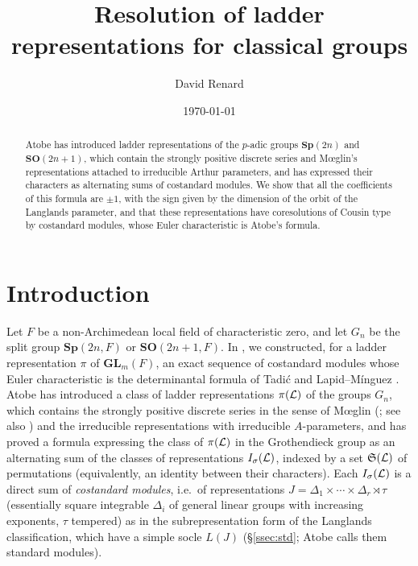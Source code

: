 \documentclass[a4paper,12pt,leqno]{amsart}
\theoremstyle{plain}
\theoremstyle{definition}
\providecommand{\frS}{\mathfrak{S}}\providecommand{\frs}{\mathfrak{s}}
\begin{document}

\title{Resolution of ladder representations for classical groups}
\author{David Renard}
\address{
Centre de Mathématiques \\
Laurent Schwartz
\\ Ecole Polytechnique }
\date{\today}

\begin{abstract}
Atobe has introduced ladder representations of the $p$-adic groups $\mathbf{Sp}(2n)$ and
$\mathbf{SO}(2n+1)$, which contain the strongly positive discrete series and M\oe glin's
representations attached to irreducible Arthur parameters, and has expressed their characters as
alternating sums of costandard modules. We show that all the coefficients of this formula are $\pm1$,
with the sign given by the dimension of the orbit of the Langlands parameter, and that these
representations have coresolutions of Cousin type by costandard modules, whose Euler characteristic is
Atobe's formula.
\end{abstract}

\maketitle

\section*{Introduction}

Let $F$ be a non-Archimedean local field of characteristic zero, and let $G_n$ be the split group
$\mathbf{Sp}(2n,F)$ or $\mathbf{SO}(2n+1,F)$. In \cite{Ren26}, we constructed, for a ladder
representation $\pi$ of $\mathbf{GL}_m(F)$, an exact sequence of costandard modules whose Euler
characteristic is the determinantal formula of Tadi\'c and Lapid--M\'inguez \cite{LM14}. Atobe
\cite{Ato24} has introduced a class of ladder representations $\pi(\mathcal{L})$ of the groups $G_n$, which
contains the strongly positive discrete series in the sense of M\oe glin (\cite{Moe02}; see also
\cite{MT02}) and the irreducible representations with
irreducible $A$-parameters, and has proved a formula expressing the class of $\pi(\mathcal{L})$ in the Grothendieck group as an
alternating sum of the classes of representations $I_\sigma(\mathcal{L})$, indexed by a set $\frS(\caL)$ of
permutations (equivalently, an identity between their characters). Each $I_\sigma(\mathcal{L})$ is a direct sum
of \emph{costandard modules}, i.e.\ of representations $J=\Delta_1\times\cdots\times\Delta_r\rtimes\tau$
(essentially square integrable $\Delta_i$ of general linear groups with increasing exponents, $\tau$
tempered) as in the subrepresentation form of the Langlands classification, which have a simple socle
$L(J)$ (\S\ref{ssec:std}; Atobe calls them standard modules).
\end{document}
